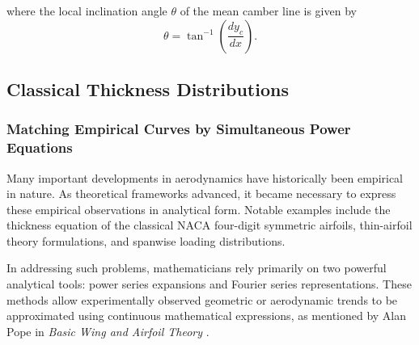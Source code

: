 where the local inclination angle $\theta$ of the mean camber line is given by
\begin{equation}
\theta = \tan^{-1}\left(\frac{dy_c}{dx}\right).
\end{equation}


\subsection*{Classical Thickness Distributions}


\subsubsection*{Matching Empirical Curves by Simultaneous Power Equations}

Many important developments in aerodynamics have historically been empirical in nature. 
As theoretical frameworks advanced, 
it became necessary to express these empirical observations in analytical form. 
Notable examples include the thickness equation of the classical NACA four-digit symmetric airfoils, thin-airfoil theory formulations, and spanwise loading distributions. 

In addressing such problems, 
mathematicians rely primarily on two powerful analytical tools: power series expansions and Fourier series representations. 
These methods allow experimentally observed geometric or aerodynamic trends to be approximated using continuous mathematical expressions, 
as mentioned by Alan Pope in \textit{Basic Wing and Airfoil Theory} \cite{basic_wing_and_airfoil_theory}.

